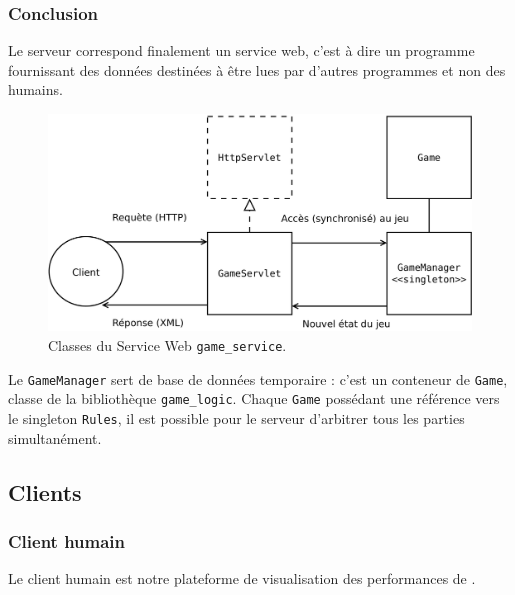 \subsubsection{Conclusion}
Le serveur correspond finalement un service web, c'est à dire un programme fournissant des données destinées à être lues par d'autres programmes et non des humains.
\begin{figure}[H] 
\centering
\includegraphics[width=\textwidth]{files/env/game_service} 
\caption{Classes du Service Web \texttt{game\_service}.} 
\label{game_service}
\end{figure}
Le \texttt{GameManager} sert de base de données temporaire : c'est un conteneur de \texttt{Game}, classe de la bibliothèque \texttt{game\_logic}. Chaque \texttt{Game} possédant une référence vers le singleton \texttt{Rules}, il est possible pour le serveur d'arbitrer tous les parties simultanément.

\subsection{Clients}

\subsubsection{Client humain}
Le client humain est notre plateforme de visualisation des performances de \cogito{}.


